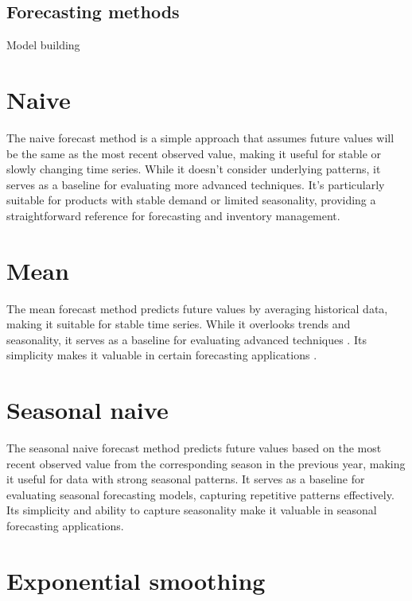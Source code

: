 \documentclass[
  authoryear,
  preprint,
  3p]{elsarticle}
\begin{document}
\hypertarget{sec-method}{%
\subsection{Forecasting methods}\label{sec-method}}

Model building

\hypertarget{naive}{%
\section{Naive}\label{naive}}

The naive forecast method is a simple approach that assumes future
values will be the same as the most recent observed value, making it
useful for stable or slowly changing time series. While it doesn't
consider underlying patterns, it serves as a baseline for evaluating
more advanced techniques\citep{hyndman2018forecasting}. It's
particularly suitable for products with stable demand or limited
seasonality, providing a straightforward reference for forecasting and
inventory management.

\hypertarget{mean}{%
\section{Mean}\label{mean}}

The mean forecast method predicts future values by averaging historical
data, making it suitable for stable time series. While it overlooks
trends and seasonality, it serves as a baseline for evaluating advanced
techniques \citep{hyndman2018forecasting}. Its simplicity makes it
valuable in certain forecasting applications
\citep{hyndman2018forecasting}.

\hypertarget{seasonal-naive}{%
\section{Seasonal naive}\label{seasonal-naive}}

The seasonal naive forecast method predicts future values based on the
most recent observed value from the corresponding season in the previous
year, making it useful for data with strong seasonal patterns. It serves
as a baseline for evaluating seasonal forecasting models, capturing
repetitive patterns effectively. Its simplicity and ability to capture
seasonality make it valuable in seasonal forecasting
applications\citep{hyndman2018forecasting}.

\hypertarget{exponential-smoothing}{%
\section{Exponential smoothing}\label{exponential-smoothing}}
\end{document}
